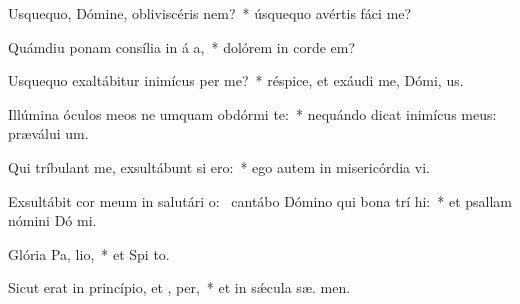 \item Usquequo, Dómine, obliviscéris   nem?~* úsquequo avértis fáci   me?
\item Quámdiu ponam consília in á a,~* dolórem in corde   em?
\item Usquequo exaltábitur inimícus  per me?~* réspice, et exáudi me, Dómi,  us.
\item Illúmina óculos meos ne umquam obdórmi  te:~* nequándo dicat inimícus meus: præválui  um.
\item Qui tríbulant me, exsultábunt si  ero:~* ego autem in misericórdia  vi.
\item Exsultábit cor meum in salutári o:~\pscross{} cantábo Dómino qui bona trí hi:~* et psallam nómini Dó mi.
\item Glória Pa,  lio,~* et Spi to.
\item Sicut erat in princípio, et ,  per,~* et in sǽcula sæ. men.
